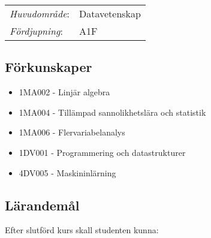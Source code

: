 \begin{tabular}{ll}\emph{Huvudområde}: & Datavetenskap\tabularnewline\emph{Fördjupning}: & A1F\tabularnewline\end{tabular}

\subsection*{Förkunskaper}

\begin{itemize}
\tightlist
\item
  1MA002 - Linjär algebra
\item
  1MA004 - Tillämpad sannolikhetslära och statistik
\item
  1MA006 - Flervariabelanalys
\item
  1DV001 - Programmering och datastrukturer
\item
  4DV005 - Maskininlärning
\end{itemize}

\subsection*{Lärandemål}

Efter slutförd kurs skall studenten kunna:

